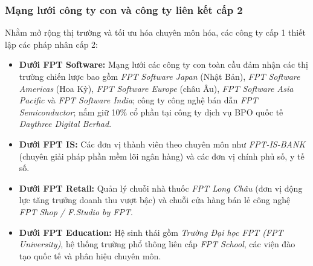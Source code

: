 \subsubsection{Mạng lưới công ty con và công ty liên kết cấp 2}
Nhằm mở rộng thị trường và tối ưu hóa chuyên môn hóa, các công ty cấp 1 thiết lập các pháp nhân cấp 2:
\begin{itemize}
    \item \textbf{Dưới FPT Software:} Mạng lưới các công ty con toàn cầu đảm nhận các thị trường chiến lược bao gồm \textit{FPT Software Japan} (Nhật Bản), \textit{FPT Software Americas} (Hoa Kỳ), \textit{FPT Software Europe} (châu Âu), \textit{FPT Software Asia Pacific} và \textit{FPT Software India}; công ty công nghệ bán dẫn \textit{FPT Semiconductor}; nắm giữ 10\% cổ phần tại công ty dịch vụ BPO quốc tế \textit{Daythree Digital Berhad}.
    \item \textbf{Dưới FPT IS:} Các đơn vị thành viên theo chuyên môn như \textit{FPT-IS-BANK} (chuyên giải pháp phần mềm lõi ngân hàng) và các đơn vị chính phủ số, y tế số.
    \item \textbf{Dưới FPT Retail:} Quản lý chuỗi nhà thuốc \textit{FPT Long Châu} (đơn vị động lực tăng trưởng doanh thu vượt bậc) và chuỗi cửa hàng bán lẻ công nghệ \textit{FPT Shop / F.Studio by FPT}.
    \item \textbf{Dưới FPT Education:} Hệ sinh thái gồm \textit{Trường Đại học FPT (FPT University)}, hệ thống trường phổ thông liên cấp \textit{FPT School}, các viện đào tạo quốc tế và phân hiệu chuyên môn.
\end{itemize}
